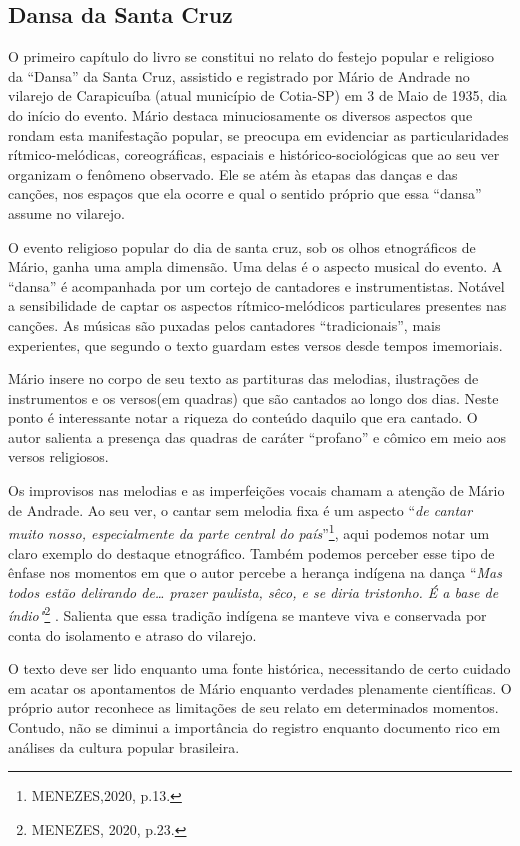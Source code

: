 \subsection{Dansa da Santa Cruz}

O primeiro capítulo do livro se constitui no relato do festejo popular e
religioso da ``Dansa'' da Santa Cruz, assistido e registrado por Mário
de Andrade no vilarejo de Carapicuíba (atual município de Cotia-SP) em 3
de Maio de 1935, dia do início do evento. Mário destaca minuciosamente
os diversos aspectos que rondam esta manifestação popular, se preocupa
em evidenciar as particularidades rítmico-melódicas, coreográficas,
espaciais e histórico-sociológicas que ao seu ver organizam o fenômeno
observado. Ele se atém às etapas das danças e das canções, nos espaços
que ela ocorre e qual o sentido próprio que essa ``dansa'' assume no
vilarejo.

O evento religioso popular do dia de santa cruz, sob os olhos
etnográficos de Mário, ganha uma ampla dimensão. Uma delas é o aspecto
musical do evento. A ``dansa'' é acompanhada por um cortejo de
cantadores e instrumentistas. Notável a sensibilidade de captar os
aspectos rítmico-melódicos particulares presentes nas canções. As
músicas são puxadas pelos cantadores ``tradicionais'', mais experientes,
que segundo o texto guardam estes versos desde tempos imemoriais.

Mário insere no corpo de seu texto as partituras das melodias,
ilustrações de instrumentos e os versos(em quadras) que são cantados ao
longo dos dias. Neste ponto é interessante notar a riqueza do conteúdo
daquilo que era cantado. O autor salienta a presença das quadras de
caráter ``profano'' e cômico em meio aos versos religiosos.

Os improvisos nas melodias e as imperfeições vocais chamam a atenção de
Mário de Andrade. Ao seu ver, o cantar sem melodia fixa é um aspecto
``\emph{de cantar muito nosso, especialmente da parte central do
país}''\footnote{MENEZES,2020, p.13.}, aqui podemos notar um claro
exemplo do destaque etnográfico. Também podemos perceber esse tipo de
ênfase nos momentos em que o autor percebe a herança indígena na dança
``\emph{Mas todos estão delirando de\ldots{} prazer paulista, sêco, e se
diria tristonho. É a base de índio"}\footnote{MENEZES, 2020, p.23.} .
Salienta que essa tradição indígena se manteve viva e conservada por
conta do isolamento e atraso do vilarejo.

O texto deve ser lido enquanto uma fonte histórica, necessitando de
certo cuidado em acatar os apontamentos de Mário enquanto verdades
plenamente científicas. O próprio autor reconhece as limitações de seu
relato em determinados momentos. Contudo, não se diminui a importância
do registro enquanto documento rico em análises da cultura popular
brasileira.


